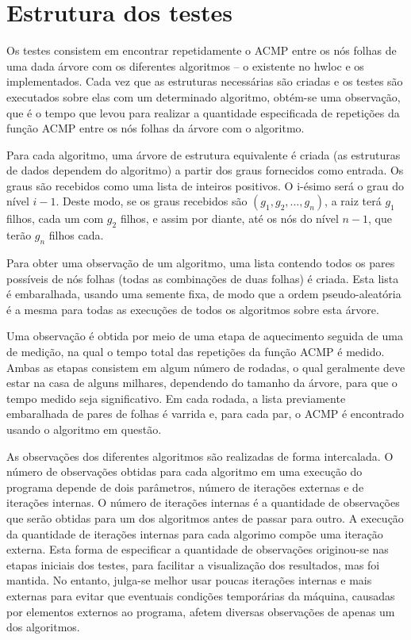 \section{Estrutura dos testes}

Os testes consistem em encontrar repetidamente o ACMP entre os nós folhas de uma dada árvore com os diferentes algoritmos -- o existente no hwloc e os implementados.
Cada vez que as estruturas necessárias são criadas e os testes são executados sobre elas com um determinado algoritmo, obtém-se uma observação, que é o tempo que levou para realizar a quantidade especificada de repetições da função ACMP entre os nós folhas da árvore com o algoritmo.

Para cada algoritmo, uma árvore de estrutura equivalente é criada (as estruturas de dados dependem do algoritmo) a partir dos graus fornecidos como entrada.
Os graus são recebidos como uma lista de inteiros positivos.
O i-ésimo será o grau do nível $i-1$.
Deste modo, se os graus recebidos são $(g_1, g_2, ..., g_n)$, a raiz terá $g_1$ filhos, cada um com $g_2$ filhos, e assim por diante, até os nós do nível $n-1$, que terão $g_n$ filhos cada.

Para obter uma observação de um algoritmo, uma lista contendo todos os pares possíveis de nós folhas (todas as combinações de duas folhas) é criada.
Esta lista é embaralhada, usando uma semente fixa, de modo que a ordem pseudo-aleatória é a mesma para todas as execuções de todos os algoritmos sobre esta árvore.

Uma observação é obtida por meio de uma etapa de aquecimento seguida de uma de medição, na qual o tempo total das repetições da função ACMP é medido.
Ambas as etapas consistem em algum número de rodadas, o qual geralmente deve estar na casa de alguns milhares, dependendo do tamanho da árvore, para que o tempo medido seja significativo.
Em cada rodada, a lista previamente embaralhada de pares de folhas é varrida e, para cada par, o ACMP é encontrado usando o algoritmo em questão.

As observações dos diferentes algoritmos são realizadas de forma intercalada.
O número de observações obtidas para cada algoritmo em uma execução do programa depende de dois parâmetros, número de iterações externas e de iterações internas.
O número de iterações internas é a quantidade de observações que serão obtidas para um dos algoritmos antes de passar para outro.
A execução da quantidade de iterações internas para cada algorimo compõe uma iteração externa.
Esta forma de especificar a quantidade de observações originou-se nas etapas iniciais dos testes, para facilitar a visualização dos resultados, mas foi mantida.
No entanto, julga-se melhor usar poucas iterações internas e mais externas para evitar que eventuais condições temporárias da máquina, causadas por elementos externos ao programa, afetem diversas observações de apenas um dos algoritmos.

